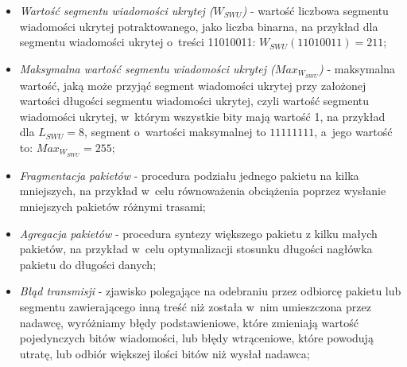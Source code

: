 \documentclass[a4paper, twoside, 12pt]{report}
\begin{document}
\begin{itemize}
        \item \emph{Wartość segmentu wiadomości ukrytej (\( W_{SWU} \))} - wartość
            liczbowa segmentu wiadomości ukrytej potraktowanego, jako liczba binarna,
            na przykład dla segmentu wiadomości ukrytej o~treści 11010011:
            \( W_{SWU}(11010011) = 211 \);

       \item \emph{Maksymalna wartość segmentu wiadomości ukrytej (\( Max_{W_{SWU}} \))} -
           maksymalna wartość, jaką może przyjąć segment wiadomości ukrytej przy
           założonej wartości długości segmentu wiadomości ukrytej, czyli wartość
           segmentu wiadomości ukrytej, w~którym wszystkie bity mają wartość 1,
           na przykład dla \( L_{SWU} = 8 \), segment o~wartości maksymalnej to
           \( 11111111 \), a~jego wartość to: \( Max_{W_{SWU}} = 255 \);

       \item \emph{Fragmentacja pakietów} - procedura podziału jednego pakietu na
           kilka mniejszych, na przykład w~celu równoważenia obciążenia poprzez
           wysłanie mniejszych pakietów różnymi trasami;

       \item \emph{Agregacja pakietów} - procedura syntezy większego pakietu z
           kilku małych pakietów, na przykład w~celu optymalizacji stosunku długości
           nagłówka pakietu do długości danych;

       \item \emph{Błąd transmisji} - zjawisko polegające na odebraniu przez odbiorcę
           pakietu lub segmentu zawierającego inną treść niż została w~nim
           umieszczona przez nadawcę, wyróżniamy błędy podstawieniowe, które
           zmieniają wartość pojedynczych bitów wiadomości, lub błędy wtrąceniowe,
           które powodują utratę, lub odbiór większej ilości bitów niż wysłał nadawca;

    \end{itemize}
\end{document}
